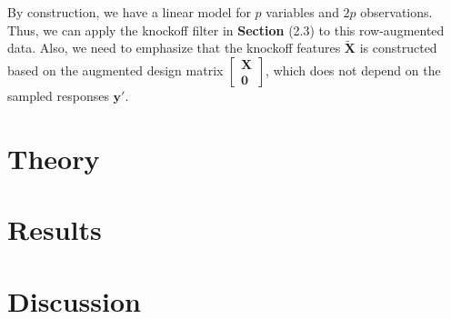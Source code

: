 \documentclass{uwstat572}
\begin{document}
By construction, we have a linear model for $p$ variables and $2p$ observations. Thus, we can apply the knockoff filter in \textbf{Section }(2.3) to this row-augmented data. Also, we need to emphasize that the knockoff features $\tilde{\bm{X}}$ is constructed based on the augmented design matrix $\begin{bmatrix}\bm{X} \\ \bm{0}\end{bmatrix}$, which does not depend on the sampled responses $\bm{y'}$.
\section{Theory}

\section{Results}

\section{Discussion}


\end{document}
